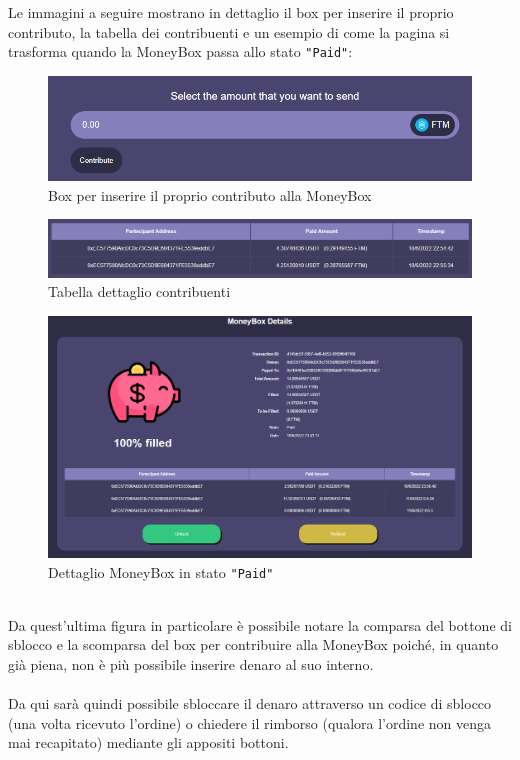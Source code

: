             Le immagini a seguire mostrano in dettaglio il box per inserire il proprio contributo, la tabella dei contribuenti e un esempio di come la pagina si trasforma quando la MoneyBox passa allo stato \texttt{"Paid"}:
            \begin{figure}[H]
                \centering
                \includegraphics[scale=0.3]{immagini/Checkout/Contribute.png} 
                \caption{Box per inserire il proprio contributo alla MoneyBox}
            \end{figure}
            \begin{figure}[H]
                \centering
                \includegraphics[scale=0.25]{immagini/Checkout/ContributionsTable.png} 
                \caption{Tabella dettaglio contribuenti}
            \end{figure}
            \begin{figure}[H]
                \centering
                \includegraphics[scale=0.4]{immagini/Checkout/FilledMoneyBox.png} 
                \caption{Dettaglio MoneyBox in stato \texttt{"Paid"}}
            \end{figure}
            \textbf{}\\
            Da quest'ultima figura in particolare è possibile notare la comparsa del bottone di sblocco e la scomparsa del box per contribuire alla MoneyBox poiché, in quanto già piena, non è più possibile inserire denaro al suo interno.\\\\
            Da qui sarà quindi possibile sbloccare il denaro attraverso un codice di sblocco (una volta ricevuto l'ordine) o chiedere il rimborso (qualora l'ordine non venga mai recapitato) mediante gli appositi bottoni.
